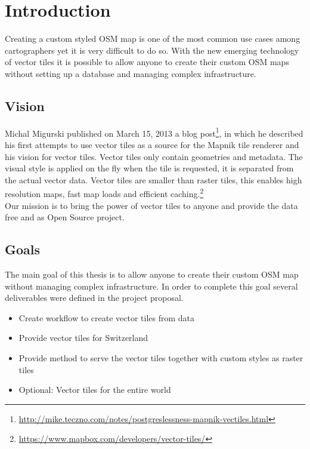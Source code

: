 \chapter{Introduction}


Creating a custom styled OSM map is one of the most common use cases
among cartographers yet it is very difficult to do so. With the new
emerging technology of vector tiles it is possible to allow anyone to
create their custom OSM maps without setting up a database and
managing complex infrastructure.


\section{Vision}\label{part1_vision}

Michal Migurski published on March 15, 2013 a blog
post\footnote{\url{http://mike.teczno.com/notes/postgreslessness-mapnik-vectiles.html}},
in which he described his first attempts to use vector tiles as a source
for the Mapnik tile renderer and his vision for vector tiles.
\newline{}
Vector tiles only contain geometries and metadata.
The visual style is applied on the fly when the tile is requested, it is separated from the
actual vector data. Vector tiles are smaller than raster tiles, this enables high resolution maps, fast map loads and efficient caching.\footnote{ \url{https://www.mapbox.com/developers/vector-tiles/}} \\
Our mission is to bring the power of vector tiles to anyone and provide
the data free and as Open Source project.


\section{Goals}\label{goals}

The main goal of this thesis is to allow anyone to create their custom
OSM map without managing complex infrastructure. In order to complete this goal
several deliverables were defined in the project proposal.

\begin{itemize}
\item
  Create workflow to create vector tiles from \osm{} data
\item
  Provide vector tiles for Switzerland
\item
  Provide method to serve the vector tiles together with
  custom styles as raster tiles
\item
  Optional: Vector tiles for the entire world
\end{itemize}


